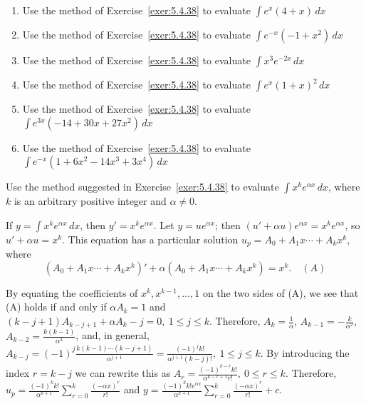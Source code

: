 \documentclass{ximera}
\begin{document}
\begin{problem}\label{exer:5.4.39}

\begin{enumerate}
\item  Use the method of Exercise~\ref{exer:5.4.38} to evaluate $  \int e^x(4+x)\,dx$
 
\item  Use the method of Exercise~\ref{exer:5.4.38} to evaluate $\int e^{-x}(-1+x^2)\,dx$

 \item Use the method of Exercise~\ref{exer:5.4.38} to evaluate $\int x^3e^{-2x}\,dx$

\item Use the method of Exercise~\ref{exer:5.4.38} to evaluate $\int e^x(1+x)^2\,dx$

\item Use the method of Exercise~\ref{exer:5.4.38} to evaluate $\int e^{3x}(-14+30x+27x^2)\,dx$

\item Use the method of Exercise~\ref{exer:5.4.38} to evaluate $\int e^{-x}(1+6x^2-14x^3+3x^4)\,dx$
\end{enumerate}
\end{problem}

\begin{problem}\label{exer:5.4.40}
Use the method suggested in Exercise~\ref{exer:5.4.38} to
evaluate $\int x^ke^{\alpha x}\,dx$, where $k$ is an arbitrary
positive integer and $\alpha\ne0$.

\begin{solution}
If $y=\int x^ke^{\alpha x}\,dx$, then $y'=x^ke^{\alpha x}$. Let
$y=ue^{\alpha x}$; then $(u'+\alpha u)e^{\alpha x}=x^ke^{\alpha x}$,
so $u'+\alpha u=x^k$. This equation has a
particular solution $u_p=A_0+A_1x\cdots+A_kx^k$, where 
$$(A_0+A_1x\cdots+A_kx^k)'+\alpha(A_0+A_1x\cdots+A_kx^k)=
x^k. \quad (A)$$

By equating the coefficients of $x^k,
x^{k-1},\dots,1$  on the two sides of (A), we see that
(A) holds if and only if $\alpha A_k=1$ and
$(k-j+1)A_{k-j+1}+\alpha
A_k-j=0,\ 1\le j\le k$.  Therefore, $A_k=\frac{1}{\alpha}$,
$A_{k-1}=-\frac{k}{\alpha^2}$, $A_{k-2}=\frac{k(k-1)}{\alpha^3}$,
and, in general,
$A_{k-j}=(-1)^j\frac{k(k-1)\cdots(k-j+1)}{\alpha^{j+1}}=
\frac{(-1)^jk!}{\alpha^{j+1}(k-j)!},\
1\le
j\le k$. By introducing the index $r=k-j$ we can rewrite this as
$A_r=\frac{(-1)^{k-r}k!}{\alpha^{k-r+1}r!},\ 0\le r\le k$.
Therefore,
$u_p=\frac{(-1)^kk!}{\alpha^{k+1}}\sum_{r=0}^k\frac{(-\alpha x)^r}{r!}$ and
$y=\frac{(-1)^kk!e^{\alpha x}}{\alpha^{k+1}}\sum_{r=0}^k \frac{(-\alpha x)^r}{r!}+c$.
\end{solution}
\end{problem}
\end{document}
